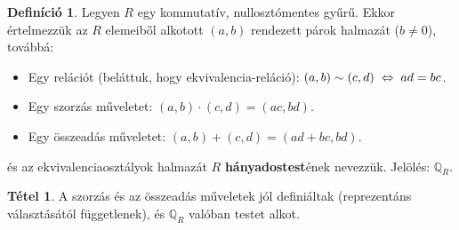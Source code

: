 \documentclass[12pt]{book}
\theoremstyle{plain} %
\theoremstyle{definition} %
\newtheorem{defi/}{Definíció}[section]
\newenvironment{defi}
  {\renewcommand{\qedsymbol}{$\clubsuit$}%
   \pushQED{\qed}\begin{defi/}}
  {\popQED\end{defi/}}
\newtheorem{theo/}{Tétel}[section]
\newenvironment{theo}
  {\renewcommand{\qedsymbol}{$\clubsuit$}%
   \pushQED{\qed}\begin{theo/}}
  {\popQED\end{theo/}}
\theoremstyle{remark}
\renewcommand\qedsymbol{$\blacksquare$}
\numberwithin{equation}{section}  %
\begin{document}

	\begin{defi}
		Legyen $R$ egy kommutatív, nullosztómentes gyűrű. Ekkor értelmezzük az $R$ elemeiből alkotott $(a,b)$ rendezett párok halmazát ($b\neq 0$), továbbá:
		\begin{itemize}
			\item Egy relációt (beláttuk, hogy ekvivalencia-reláció): $(a,b) \sim (c,d) \hspace{1mm} \Leftrightarrow \hspace{1mm} ad=bc$.
			\item Egy szorzás műveletet: $(a,b)\cdot (c,d) = (ac,bd)$.
			\item Egy összeadás műveletet: $(a,b)+(c,d)=(ad+bc,bd)$.
		\end{itemize}
		és az ekvivalenciaosztályok halmazát $R$ \textbf{hányadostest}ének nevezzük. Jelölés: $\mathbb{Q}_R$.
	\end{defi}
	
	\begin{theo}
		A szorzás és az összeadás műveletek jól definiáltak (reprezentáns választásától függetlenek), és $\mathbb{Q}_R$ valóban testet alkot.
	\end{theo}
\end{document}
